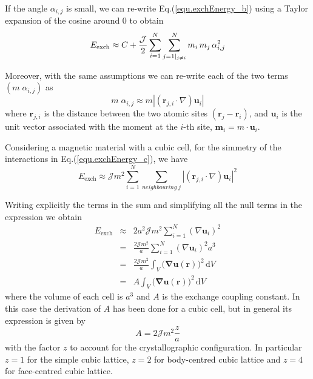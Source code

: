 \documentclass[11pt]{article}
\renewcommand{\d}{\mathrm{d}} %
\newcommand{\rv}[1]{\ensuremath{\mathbf{#1}}} %
\begin{document}
If the angle $\alpha_{i,j}$ is small, we can re-write
Eq.(\ref{equ.exchEnergy_b}) using a Taylor expansion of the cosine
around 0 to obtain   
\begin{equation}
E_\mathrm{exch} \approx  C + \frac{\mathcal{J}}{2}
\sum_{i = 1}^{ N} \sum_{j =  1\arrowvert_{ j \neq i }}^{ N } m_i \,
m_j \, \alpha_{i,j}^2  
\label{equ.exchEnergy_c}
\end{equation}

Moreover, with the same assumptions we can re-write each of the two
terms $( m \; \alpha_{i,j})$ as  
\begin{equation}
m \; \alpha_{i,j} \approx m \left| ( \rv{r}_{j,i} \cdot  \nabla )
\rv{u}_i \right|  
\label{equ.angleExpansion}
\end{equation}
where $\rv{r}_{j,i}$ is the distance between the two atomic sites $\left(
  \rv{r}_j - \rv{r}_i \right)$, and $\rv{u}_i$ is the unit 
vector associated with the moment at the $i$-th site, $\rv{m}_i = m
\cdot \rv{u}_i$. 

Considering a magnetic material with a cubic cell, for the simmetry of
the interactions in Eq.(\ref{equ.exchEnergy_c}), we have 
\begin{equation}
E_\mathrm{exch} \approx  \mathcal{J} m^2 \sum_{i = 1}^{ N}
\sum_{neighbouring \; j} \left| ( \rv{r}_{j,i} \cdot  \nabla )
\rv{u}_i \right|^2 
\label{equ.exchEnergy_d}
\end{equation}

Writing explicitly the terms in the sum and simplifying all the
null terms in the expression we obtain  
\begin{eqnarray} 
E_\mathrm{exch}    & \approx & 2 a^2 \mathcal{J} m^2 
                       \sum_{i = 1}^N  \left( \nabla
                         \rv{u}_i \right)^2  
\\
                       & = & \frac{2 \mathcal{J} m^2}{a} 
                       \sum_{i = 1}^N  \left( \nabla
                         \rv{u}_i \right)^2 a^3  
\label{equ.exchangeAnalytic_a}
\\
                       & = & \frac{2 \mathcal{J} m^2}{a}
                       \int_{V} \rv{\Big( \nabla  u(r) \Big)}^2 \, \d V 
\label{equ.exchangeAnalytic_b}
\\
                       & = & A \int_{V} \rv{\Big( \nabla u(r) \Big)}^2
                       \, \d V 
\label{equ.exchangeAnalytic_c}
\end{eqnarray}
where the volume of each cell is $a^3$ and $A$ is the
exchange coupling constant. In this case the derivation of $A$ has
been done for a cubic cell, but in general its expression is given by 
\begin{equation}
  A = 2\mathcal{J}m^2\frac{z}{a}
\end{equation}
with the factor $z$ to account for the crystallographic configuration.
In particular $z= 1$ for the simple cubic lattice, $z= 2$ for
body-centred cubic lattice and $z= 4$ for face-centred cubic lattice.
 
\end{document}

